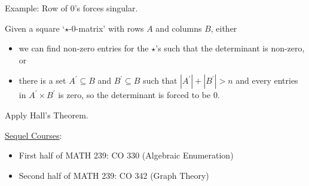 Example: Row of $ 0 $'s forces singular.

\begin{Proposition}{}{}
    Given a square `$ \star $-$ 0 $-matrix' with rows $ A $ and columns $ B $,
    either
    \begin{itemize}
        \item we can find non-zero entries for the $ \star $'s such that the determinant
              is non-zero, or
        \item there is a set $ A^\prime\subseteq B $ and $ B^\prime \subseteq B $
              such that $ |A^\prime|+|B^\prime|>n $ and every entries in $ A^\prime\times B^\prime $
              is zero, so the determinant is forced to be $ 0 $.
    \end{itemize}
\end{Proposition}

\begin{Proof}{}{}
    Apply Hall's Theorem.
\end{Proof}

\underline{Sequel Courses}:
\begin{itemize}
    \item First half of MATH 239: CO 330 (Algebraic Enumeration)
    \item Second half of MATH 239: CO 342 (Graph Theory)
\end{itemize}
